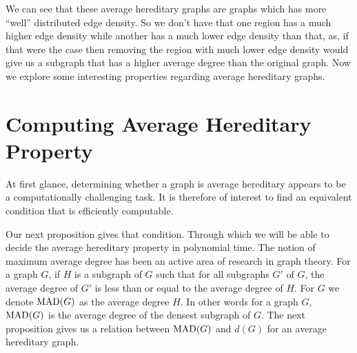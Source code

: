 \documentclass{article}
\newcommand{\MAD}{\ensuremath{\text{\textit{MAD}}}}
\begin{document}
We can see that these average hereditary graphs are graphs which has more ``well'' distributed edge density. So we don't have that one region has a much higher edge density while another has a much lower edge density than that, as, if that were the case then removing the region with much lower edge density would give us a subgraph that has a higher average degree than the original graph.
Now we explore some interesting properties regarding average hereditary graphs.


\section{Computing Average Hereditary Property}\label{sec: computing}
At first glance, determining whether a graph is average hereditary appears to be a computationally challenging task. It is therefore of interest to find an equivalent condition that is efficiently computable.

Our next proposition gives that condition. Through which we will be able to decide the average hereditary property in polynomial time. 
The notion of maximum average degree has been an active area of research in graph theory. For a graph $G$, if $H$ is a subgraph of $G$ such that for all subgraphs $G'$ of $G$, the average degree of $G'$ is less than or equal to the average degree of $H$. For $G$ we denote $\MAD(G)$ as the average degree $H$. In other words for a graph $G$, $\MAD(G)$ is the average degree of the densest subgraph of $G$. The next proposition gives us a relation between $\MAD(G)$ and $d(G)$ for an average hereditary graph. 
\end{document}
